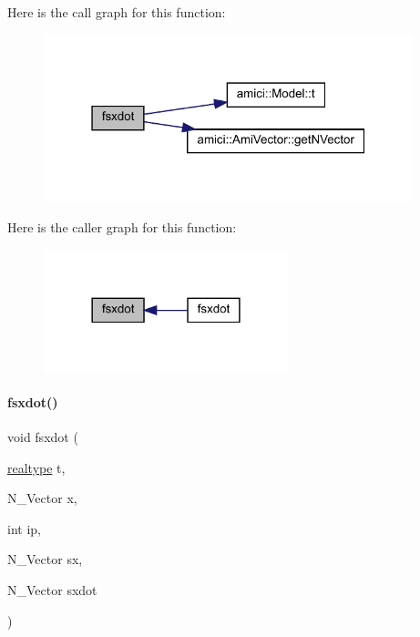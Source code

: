 Here is the call graph for this function\+:
\nopagebreak
\begin{figure}[H]
\begin{center}
\leavevmode
\includegraphics[width=304pt]{classamici_1_1_model___o_d_e_a01f84575fd8df46a04fd472bbbc9d821_cgraph}
\end{center}
\end{figure}
Here is the caller graph for this function\+:
\nopagebreak
\begin{figure}[H]
\begin{center}
\leavevmode
\includegraphics[width=201pt]{classamici_1_1_model___o_d_e_a01f84575fd8df46a04fd472bbbc9d821_icgraph}
\end{center}
\end{figure}
\mbox{\label{classamici_1_1_model___o_d_e_a786f028681b0928eb431cd44e9bd254a}} 
\paragraph{\texorpdfstring{fsxdot()}{fsxdot()}\hspace{0.1cm}{\footnotesize\ttfamily [2/3]}}
{\footnotesize\ttfamily void fsxdot (\begin{DoxyParamCaption}\item[{\mbox{\hyperlink{namespaceamici_a1bdce28051d6a53868f7ccbf5f2c14a3}{realtype}}}]{t,  }\item[{N\+\_\+\+Vector}]{x,  }\item[{int}]{ip,  }\item[{N\+\_\+\+Vector}]{sx,  }\item[{N\+\_\+\+Vector}]{sxdot }\end{DoxyParamCaption})}

